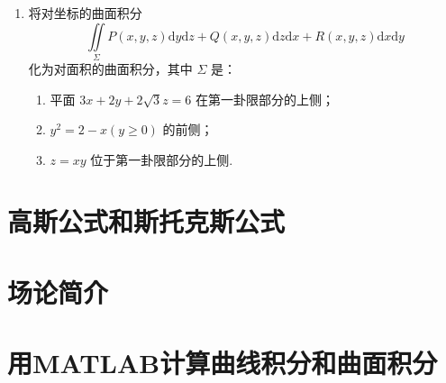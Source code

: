\begin{enumerate}
    \item 将对坐标的曲面积分
    \[
        \iint\limits_{\Sigma}P(x, y, z)\text{d}y\text{d}z+Q(x, y, z)\text{d}z\text{d}x+R(x, y, z)\text{d}x\text{d}y
    \]
    化为对面积的曲面积分，其中 $\Sigma$ 是：
    \begin{enumerate}[(1)]\setlength{\itemsep}{5pt}\setlength{\topsep}{15pt}
        \item 平面 $3x+2y+2\sqrt{3}z=6$ 在第一卦限部分的上侧；
        \item $y^2=2-x(y\geqslant0)$ 的前侧；
        \item $z=xy$ 位于第一卦限部分的上侧.
    \end{enumerate}    
    
\end{enumerate}

\section{高斯公式和斯托克斯公式}


\section{场论简介}


\section{用MATLAB计算曲线积分和曲面积分}